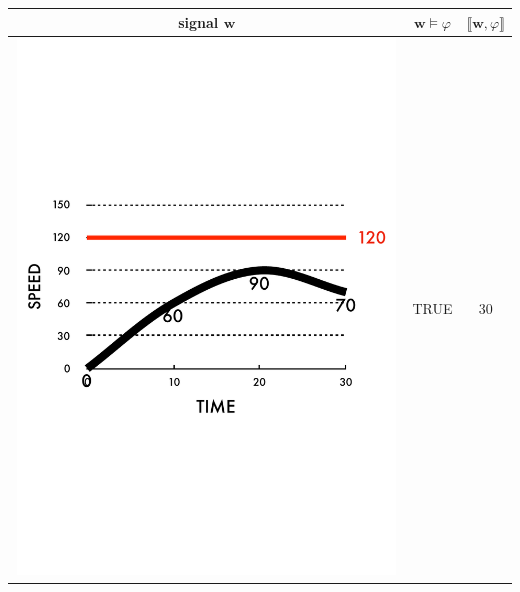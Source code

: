\documentclass[a0paper,portrait]{baposter}
\newcommand{\bw}{\mathbf{w}}
\newcommand{\sem}[1]{\llbracket #1 \rrbracket}
\begin{document}
\begin{poster}
{\begin{tabular}{c|c|c}
 signal $\bw$  &$\bw\models\varphi$
 & $\sem{\bw,\varphi}$
\\ \hline
 \begin{minipage}{0.4\textwidth}\vspace{+0.2em}\includegraphics[width=0.99\textwidth]{figures/stleg1.pdf} \end{minipage}\vspace{+0.2em}
& TRUE & 30  \\ \hline

\end{tabular}}
\end{poster}
\end{document}

